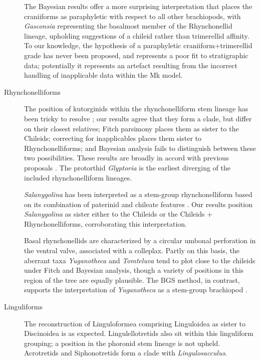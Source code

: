 \documentclass[openany]{book}
\begin{document}
\begin{description}
The Bayesian results offer a more surprising interpretation that places
the craniiforms as paraphyletic with respect to all other brachiopods,
with \emph{Gasconsia} representing the basalmost member of the
Rhynchonellid lineage, upholding suggestions
\citep{Holmer2014OrdovicianSilurian} of a chileid rather than
trimerellid affinity. To our knowledge, the hypothesis of a paraphyletic
craniiform+trimerellid grade has never been proposed, and represents a
poor fit to stratigraphic data; potentially it represents an artefact
resulting from the incorrect handling of inapplicable data within the Mk
model.
\item[Rhynchonelliforms]
The position of kutorginids within the rhynchonelliform stem lineage has
been tricky to resolve \citep{Holmer2018Theattachment}; our results
agree that they form a clade, but differ on their closest relatives;
Fitch parsimony places them as sister to the Chileids; correcting for
inapplicables places them sister to Rhynchonelliforms; and Bayesian
analysis fails to distinguish between these two possibilities. These
results are broadly in accord with previous proposals
\citep{Holmer2018Evolutionarysignificance}. The protorthid
\emph{Glyptoria} is the earliest diverging of the included
rhynchonelliform lineages.

\emph{Salanygolina} has been interpreted as a stem-group
rhynchonelliform based on its combination of paterinid and chileate
features \citep{Holmer2009Theenigmatic}. Our results position
\emph{Salanygolina} as sister either to the Chileids or the Chileids +
Rhynchonelliforms, corroborating this interpretation.

Basal rhynchonellids are characterized by a circular umbonal perforation
in the ventral valve, associated with a colleplax. Partly on this basis,
the aberrant taxa \emph{Yuganotheca} and \emph{Tomteluva} tend to plot
close to the chileids under Fitch and Bayesian analysis, though a
variety of positions in this region of the tree are equally plausible.
The BGS method, in contrast, supports the interpretation of
\emph{Yuganotheca} as a stem-group brachiopod \citep{Zhang2014Anearly}.
\item[Linguliforms]
The reconstruction of Linguloformea comprising Linguloidea as sister to
Discinoidea is as expected. Lingulellotretids also sit within this
linguliform grouping; a position in the phoronid stem lineage
\citep[advocated by][]{Balthasar2009EarlyCambrian} is not upheld.
Acrotretids and Siphonotretids form a clade with \emph{Lingulosacculus}.


\end{description}
\end{document}

